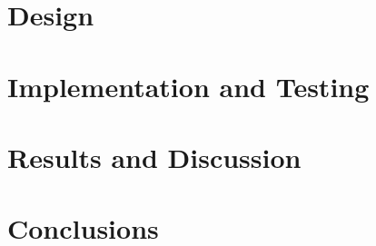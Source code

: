 \documentclass{report}
\begin{document}
    \newpage
    \chapter{Design}
    
    \newpage
    \chapter{Implementation and Testing}
    
    \newpage
    \chapter{Results and Discussion}
    
    \newpage
    \chapter{Conclusions}
    
    
    
    \begin{appendix}
    	\newpage  
    	\listoffigures
    	\listoftables
    	\newpage
    	
    	
    \end{appendix}
    
\end{document}
